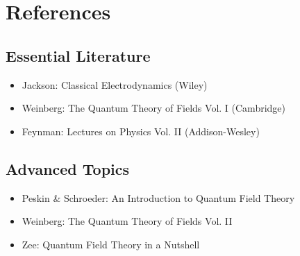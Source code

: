 \documentclass[12pt,a4paper]{article}
\begin{document}
	\section{References}
	\subsection{Essential Literature}
	\begin{itemize}
		\item Jackson: Classical Electrodynamics (Wiley)
		\item Weinberg: The Quantum Theory of Fields Vol. I (Cambridge)
		\item Feynman: Lectures on Physics Vol. II (Addison-Wesley)
	\end{itemize}
	
	\subsection{Advanced Topics}
	\begin{itemize}
		\item Peskin \& Schroeder: An Introduction to Quantum Field Theory
		\item Weinberg: The Quantum Theory of Fields Vol. II
		\item Zee: Quantum Field Theory in a Nutshell
	\end{itemize}
	
\end{document}

